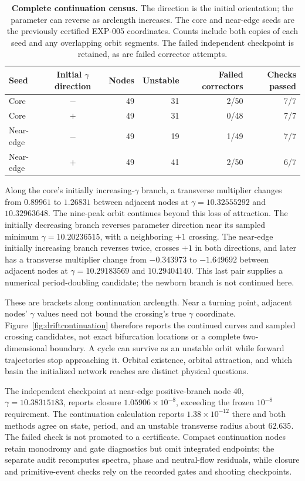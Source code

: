 \begin{table}[H]
\centering\small
\begin{tabular}{lcrrrr}
\toprule
Seed & Initial $\gamma$ direction & Nodes & Unstable & Failed correctors & Checks passed\\
\midrule
Core & $-$ & 49 & 31 & 2/50 & 7/7\\
Core & $+$ & 49 & 31 & 0/48 & 7/7\\
Near-edge & $-$ & 49 & 19 & 1/49 & 7/7\\
Near-edge & $+$ & 49 & 41 & 2/50 & 6/7\\
\bottomrule
\end{tabular}
\caption{\textbf{Complete continuation census.} The direction is the initial orientation; the parameter can reverse as arclength increases. The core and near-edge seeds are the previously certified EXP-005 coordinates. Counts include both copies of each seed and any overlapping orbit segments. The failed independent checkpoint is retained, as are failed corrector attempts.}
\label{tab:continuation}
\end{table}

Along the core's initially increasing-$\gamma$ branch, a transverse multiplier changes from $0.89961$ to $1.26831$ between adjacent nodes at $\gamma=10.32555292$ and $10.32963648$. The nine-peak orbit continues beyond this loss of attraction. The initially decreasing branch reverses parameter direction near its sampled minimum $\gamma=10.20236515$, with a neighboring $+1$ crossing. The near-edge initially increasing branch reverses twice, crosses $+1$ in both directions, and later has a transverse multiplier change from $-0.343973$ to $-1.649692$ between adjacent nodes at $\gamma=10.29183569$ and $10.29404140$. This last pair supplies a numerical period-doubling candidate; the newborn branch is not continued here.

These are brackets along continuation arclength. Near a turning point, adjacent nodes' $\gamma$ values need not bound the crossing's true $\gamma$ coordinate. Figure~\ref{fig:driftcontinuation} therefore reports the continued curves and sampled crossing candidates, not exact bifurcation locations or a complete two-dimensional boundary. A cycle can survive as an unstable orbit while forward trajectories stop approaching it. Orbital existence, orbital attraction, and which basin the initialized network reaches are distinct physical questions.

The independent checkpoint at near-edge positive-branch node 40, $\gamma=10.38315183$, reports closure $1.05906\times10^{-8}$, exceeding the frozen $10^{-8}$ requirement. The continuation calculation reports $1.38\times10^{-12}$ there and both methods agree on state, period, and an unstable transverse radius about $62.635$. The failed check is not promoted to a certificate. Compact continuation nodes retain monodromy and gate diagnostics but omit integrated endpoints; the separate audit recomputes spectra, phase and neutral-flow residuals, while closure and primitive-event checks rely on the recorded gates and shooting checkpoints.

